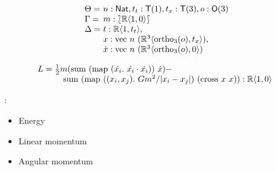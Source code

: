 \documentclass[xetex,serif,mathserif]{beamer}
\newenvironment{slide}[1]{\begin{frame}\frametitle{#1}}{\end{frame}}
\begin{document}
\begin{slide}{}
  \begin{displaymath}
    \begin{array}{l@{\hspace{0.3em}}l}
      \Theta = & n : \mathsf{Nat}, t_t : \mathsf{T}(1), t_x : \mathsf{T}(3), o : \mathsf{O}(3) \\
      \Gamma = & m : \typeOfCartSp{\mathbb{R}\langle 1, 0 \rangle} \\
      \Delta = &
      \begin{array}[t]{@{}l}
        t : \mathbb{R}\langle 1, t_t \rangle, \\
        x : \mathrm{vec}~n~(\mathbb{R}^3\langle \mathrm{ortho}_3(o), t_x \rangle), \\
        \dot{x} : \mathrm{vec}~n~(\mathbb{R}^3\langle \mathrm{ortho}_3(o), 0 \rangle)
      \end{array}
    \end{array}
  \end{displaymath}

  \smallskip

  \begin{displaymath}
    L =
    \begin{array}[t]{@{}l}
      \frac{1}{2}m(\mathrm{sum}~(\mathrm{map}~(\dot{x_i}.~\dot{x_i}\cdot\dot{x_i}))~\dot{x}) - \\
      \quad \mathrm{sum}~(\mathrm{map}~((x_i,x_j).~Gm^2/|x_i - x_j|)~(\mathrm{cross}~x~x)) : \mathbb{R}\langle 1, 0 \rangle
    \end{array}
  \end{displaymath}

  \pause

  :
  \begin{itemize}
  \item Energy
  \item Linear momentum
  \item Angular momentum
  \end{itemize}
  

\end{slide}
\end{document}
